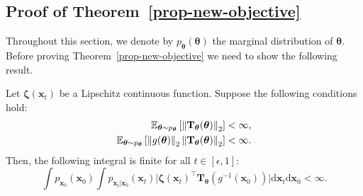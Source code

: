 \subsection{Proof of Theorem~\ref{prop-new-objective}} \label{proof-prop-new-objective}
Throughout this section, we denote by $p_{\boldsymbol{\theta}}(\boldsymbol{\theta})$ the marginal distribution of $\boldsymbol{\theta}$. Before proving Theorem~\ref{prop-new-objective} we need to show the following result.
\begin{lemma}
\label{lemma-bound-fubini}
Let $\boldsymbol{\zeta}(\mathbf{x}_t)$ be a Lipschitz continuous function. Suppose the following conditions hold:
\begin{equation}
\label{eq-lemma-finite-conditions}
\begin{aligned}
\mathbb{E}_{\boldsymbol{\theta}\sim  p_{\boldsymbol{\theta}}}\left[\left\lVert \mathbf{T}_{\boldsymbol{\theta}}(\boldsymbol{\theta}) \right\rVert_2\right] &< \infty, \\
\mathbb{E}_{\boldsymbol{\theta}\sim  p_{\boldsymbol{\theta}}}\left[\left\lVert g(\boldsymbol{\theta}) \right\rVert_2\left\lVert \mathbf{T}_{\boldsymbol{\theta}}(\boldsymbol{\theta}) \right\rVert_2\right] &< \infty.
\end{aligned}
\end{equation}
Then, the following integral is finite for all $ t \in [\epsilon, 1] $:
\begin{equation}
\label{eq-finite-integral-zeta-T}
\int p_{\mathbf{x}_0}(\mathbf{x}_0) 
\int p_{\mathbf{x}_t|\mathbf{x}_0}(\mathbf{x}_t)
\vert \boldsymbol{\zeta}(\mathbf{x}_t)^{\top} 
\mathbf{T}_{\boldsymbol{\theta}}(g^{-1}({\mathbf{x}}_{0}))\vert 
\mathrm{d}\mathbf{x}_t \mathrm{d}\mathbf{x}_0 < \infty.
\end{equation}
\end{lemma}



